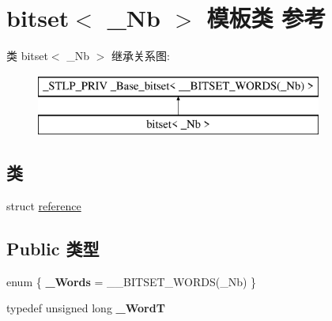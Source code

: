 \hypertarget{classbitset}{}\section{bitset$<$ \+\_\+\+Nb $>$ 模板类 参考}
\label{classbitset}
类 bitset$<$ \+\_\+\+Nb $>$ 继承关系图\+:\begin{figure}[H]
\begin{center}
\leavevmode
\includegraphics[height=2.000000cm]{classbitset}
\end{center}
\end{figure}
\subsection*{类}
\begin{DoxyCompactItemize}
\item 
struct \hyperlink{structbitset_1_1reference}{reference}
\end{DoxyCompactItemize}
\subsection*{Public 类型}
\begin{DoxyCompactItemize}
\item 
\mbox{\label{classbitset_a19726dfe4871390a6b10ca573173e20e}} 
enum \{ {\bfseries \+\_\+\+Words} = \+\_\+\+\_\+\+B\+I\+T\+S\+E\+T\+\_\+\+W\+O\+R\+DS(\+\_\+\+Nb)
 \}
\item 
\mbox{\label{classbitset_a0ff8a28f51bee0856e1f8e153f77d330}} 
typedef unsigned long {\bfseries \+\_\+\+WordT}
\end{DoxyCompactItemize}
